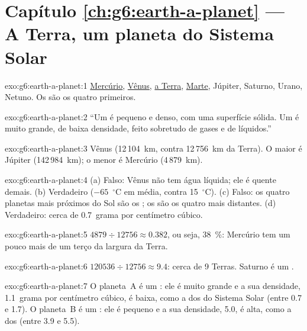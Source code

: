 \section*{Capítulo \ref{ch:g6:earth-a-planet} --- A Terra, um planeta do Sistema Solar}

\begin{solution}{exo:g6:earth-a-planet:1}
\underline{Mercúrio}, \underline{Vênus}, \underline{a Terra},
\underline{Marte}, Júpiter, Saturno, Urano, Netuno. Os 
são os quatro primeiros.
\end{solution}

\begin{solution}{exo:g6:earth-a-planet:2}
``Um  é pequeno e denso, com uma superfície sólida. Um
 é muito grande, de baixa densidade, feito sobretudo de
gases e de líquidos.''
\end{solution}

\begin{solution}{exo:g6:earth-a-planet:3}
Vênus (12\,104~km, contra 12\,756~km da Terra). O maior é Júpiter
(142\,984~km); o menor é Mercúrio (4\,879~km).
\end{solution}

\begin{solution}{exo:g6:earth-a-planet:4}
(a) Falso: Vênus não tem água líquida; ele é quente demais. (b) Verdadeiro
($-65$~$^\circ$C em média, contra 15~$^\circ$C). (c) Falso: os quatro
planetas mais próximos do Sol são os ; os  são os quatro mais distantes. (d) Verdadeiro: cerca de
0.7~grama por centímetro cúbico.
\end{solution}

\begin{solution}{exo:g6:earth-a-planet:5}
$4879 \div 12756 \approx 0.382$, ou seja, 38~\%: Mercúrio tem um pouco
mais de um terço da largura da Terra.
\end{solution}

\begin{solution}{exo:g6:earth-a-planet:6}
$120536 \div 12756 \approx 9.4$: cerca de 9 Terras. Saturno é um .
\end{solution}

\begin{solution}{exo:g6:earth-a-planet:7}
O planeta~A é um : ele é muito grande e a sua densidade,
1.1~grama por centímetro cúbico, é baixa, como a dos  do
Sistema Solar (entre 0.7 e 1.7). O planeta~B é um : ele é
pequeno e a sua densidade, 5.0, é alta, como a dos  (entre
3.9 e 5.5).
\end{solution}

